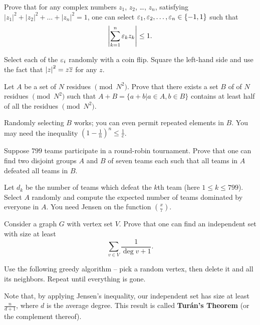 \documentclass[11pt]{scrartcl}
\begin{document}
\begin{problem}
	[Romania 2004] Prove that for any complex numbers $z_1$, $z_2$, \dots, $z_n$, satisfying
	$\left\lvert z_1 \right\rvert^2 + \left\lvert z_2 \right\rvert^2 + \dots + \left\lvert z_n \right\rvert^2 = 1$,
	one can select $\varepsilon_1, \varepsilon_2, \dots, \varepsilon_n \in \{-1,1\}$ such that
	\[ \left\lvert \sum_{k=1}^n \varepsilon_k z_k \right\rvert \le 1. \]
	\begin{sketch}
		Select each of the $\varepsilon_i$ randomly with a coin flip.
		Square the left-hand side and use the fact that $\left\lvert z \right\rvert^2 = z \overline z$ for any $z$.
	\end{sketch}
\end{problem}

\begin{problem}
	[Shortlist 1999 C4] Let $A$ be a set of $N$ residues $\pmod{N^{2}}$. Prove that there exists a set $B$ of of $N$ residues $\pmod{N^{2}}$ such that $A + B = \{a+b|a \in A, b \in B\}$ contains at least half of all the residues $\pmod{N^{2}}$.
	\begin{sketch}
		Randomly selecting $B$ works; you can even permit repeated elements in $B$.
		You may need the inequality $\left( 1 - \frac 1n \right)^n \le \frac 1e$.
	\end{sketch}
\end{problem}

\begin{problem}
	 Suppose $799$ teams participate in a round-robin tournament.
	Prove that one can find two disjoint groups $A$ and $B$ of seven teams each
	such that all teams in $A$ defeated all teams in $B$.
	\begin{sketch}
		Let $d_k$ be the number of teams which defeat the $k$th team (here $1 \le k \le 799$).
		Select $A$ randomly and compute the expected number of teams dominated by everyone in $A$.
		You need Jensen on the function $\binom x7$.
	\end{sketch}
\end{problem}

\begin{problem}
	 \label{thm:carowei}
	Consider a graph $G$ with vertex set $V$. Prove that one can find an independent set
	with size at least
	\[ \sum_{v \in V} \frac{1}{\deg v + 1}. \]
	\begin{sketch}
		Use the following greedy algorithm --
		pick a random vertex, then delete it and all its neighbors.
		Repeat until everything is gone.
	\end{sketch}
\end{problem}
\begin{remark*}
	Note that, by applying Jensen's inequality, our independent set has size at least $\frac{n}{d+1}$, where $d$ is the average degree.
	This result is called \textbf{Tur\'an's Theorem} (or the complement thereof).
\end{remark*}
\end{document}
